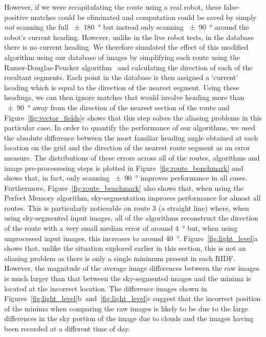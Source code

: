 \documentclass[letterpaper]{article}
\begin{document}
However, if we were recapitulating the route using a real robot, these false-positive matches could be eliminated and computation could be saved by simply \emph{not} scanning the full \SI{\pm 180}{\degree} but instead only scanning \SI{\pm 90}{\degree} around the robot's current heading.
However, unlike in the live robot tests, in the database there is no current heading.
We therefore simulated the effect of this modified algorithm using our database of images by simplifying each route using the Ramer-Douglas-Peucker algorithm~\citep{Ramer1972} and calculating the direction of each of the resultant segments.
Each point in the database is then assigned a `current' heading which is equal to the direction of the nearest segment.
Using these headings, we can then ignore matches that would involve heading more than \SI{\pm 90}{\degree} away from the direction of the nearest section of the route and Figure~\ref{fig:vector_fields}c shows that this step solves the aliasing problems in this particular case.
In order to quantify the performance of our algorithms, we used the absolute difference between the most familiar heading angle obtained at each location on the grid and the direction of the nearest route segment as an error measure.
The distributions of these errors across all of the routes, algorithms and image pre-processesing steps is plotted in Figure~\ref{fig:route_benchmark} and shows that, in fact, only scanning \SI{\pm 90}{\degree} improves performance in all cases.
Furthermore, Figure~\ref{fig:route_benchmark} also shows that, when using the Perfect Memory algorithm, sky-segmentation improves performance for almost all routes.
This is particularly noticeable on route 3 (a straight line) where, when using sky-segmented input images, all of the algorithms reconstruct the direction of the route with a very small median error of around \SI{4}{\degree} but, when using unprocessed input images, this increases to around \SI{40}{\degree}.
Figure~\ref{fig:light_level}a shows that, unlike the situation explored earlier in this section, this is not an aliasing problem as there is only a single minimum present in each RIDF.
However, the magnitude of the average image differences between the raw images is much larger than that between the sky-segmented images and the minima is located at the incorrect location.
The difference images shown in Figures~\ref{fig:light_level}b~and~\ref{fig:light_level}c suggest that the incorrect position of the minima when comparing the raw images is likely to be due to the large differences in the sky portion of the image due to clouds and the images having been recorded at a different time of day.
\end{document}
